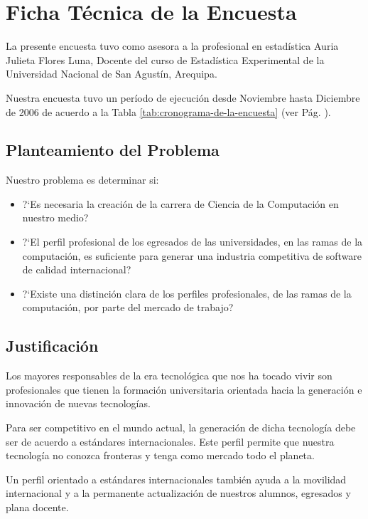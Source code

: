 \section{Ficha Técnica de la Encuesta}\label{sec:cs-ficha-tecnica-de-la-encuesta}

La presente encuesta tuvo como asesora a la profesional en estadística Auria Julieta Flores Luna, Docente del curso de Estadística Experimental de la Universidad Nacional de San Agustín, Arequipa. 

Nuestra encuesta tuvo un período de ejecución desde Noviembre hasta Diciembre de 2006 de acuerdo a la Tabla \ref{tab:cronograma-de-la-encuesta} (ver Pág. \pageref{tab:cronograma-de-la-encuesta}).

\subsection{Planteamiento del Problema}
Nuestro problema es determinar si: 

\begin{itemize}
\item ?`Es necesaria la creación de la carrera de Ciencia de la Computación en nuestro medio?
\item ?`El perfil profesional de los egresados de las universidades, en las ramas de la computación, es suficiente para generar una industria competitiva de software de calidad internacional?
\item ?`Existe una distinción clara de los perfiles profesionales, de las ramas de la computación, por parte del mercado de trabajo?
\end{itemize}

\subsection{Justificación}
Los mayores responsables de la era tecnológica que nos ha tocado vivir son profesionales que tienen la formación universitaria orientada hacia la generación e innovación de nuevas tecnologías.

Para ser competitivo en el mundo actual, la generación de dicha tecnología debe ser de acuerdo a estándares internacionales. Este perfil permite que nuestra tecnología no conozca fronteras y tenga como mercado todo el planeta.

Un perfil orientado a estándares internacionales también ayuda a la movilidad internacional y a la permanente actualización de nuestros alumnos, egresados y plana docente.

